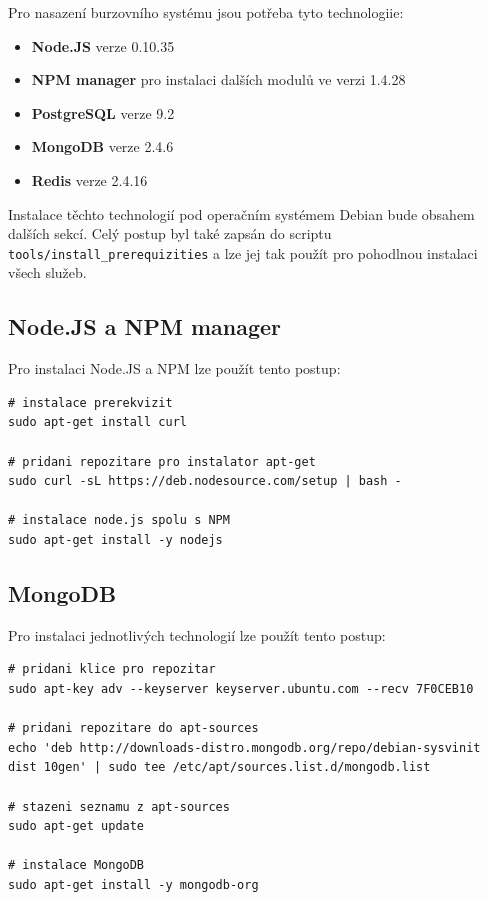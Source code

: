 \documentclass[thesis=M,czech]{FITthesis}[2012/06/26]
\begin{document}
	Pro nasazení burzovního systému jsou potřeba tyto technologiie:
	
\begin{itemize}

\item \textbf{Node.JS} verze 0.10.35

\item \textbf{NPM manager} pro instalaci dalších modulů ve verzi 1.4.28

\item \textbf{PostgreSQL} verze 9.2

\item \textbf{MongoDB} verze 2.4.6

\item \textbf{Redis} verze 2.4.16

\end{itemize}

	Instalace těchto technologií pod operačním systémem Debian bude obsahem dalších sekcí. Celý postup byl také zapsán do scriptu \texttt{tools/install\_prerequizities} a lze jej tak použít pro pohodlnou instalaci všech služeb.


\subsection{Node.JS a NPM manager}
	
	Pro instalaci Node.JS a NPM lze použít tento postup:

\begin{lstlisting}[basicstyle={\tiny\ttfamily}, frame=single]
# instalace prerekvizit
sudo apt-get install curl

# pridani repozitare pro instalator apt-get
sudo curl -sL https://deb.nodesource.com/setup | bash -

# instalace node.js spolu s NPM 
sudo apt-get install -y nodejs
\end{lstlisting}

\subsection{MongoDB}
	
	Pro instalaci jednotlivých technologií lze použít tento postup:

\begin{lstlisting}[basicstyle={\tiny\ttfamily}, frame=single]
# pridani klice pro repozitar
sudo apt-key adv --keyserver keyserver.ubuntu.com --recv 7F0CEB10

# pridani repozitare do apt-sources
echo 'deb http://downloads-distro.mongodb.org/repo/debian-sysvinit dist 10gen' | sudo tee /etc/apt/sources.list.d/mongodb.list

# stazeni seznamu z apt-sources
sudo apt-get update

# instalace MongoDB
sudo apt-get install -y mongodb-org
\end{lstlisting}
\end{document}
